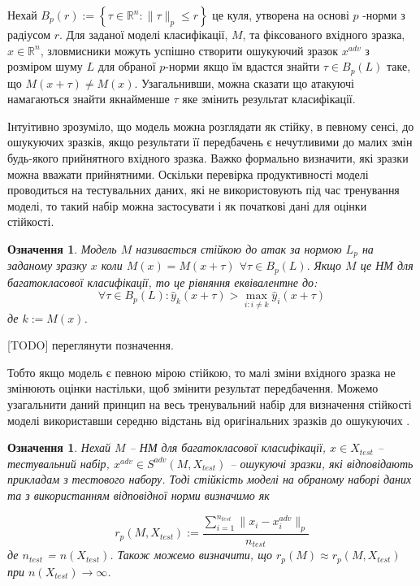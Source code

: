 \documentclass[14pt,a4paper]{extarticle}
\newcounter{e}
\newtheorem{defn}[theorem]{Означення}
\numberwithin{equation}{section}
\numberwithin{figure}{section}
\begin{document}
 Нехай $B_{p}(r):=\left\{\tau \in \mathbb{R}^{n}:\|\tau\|_{p} \leq r\right\}$ це куля, утворена на основі $p$ -норми з радіусом $r$. Для заданої моделі класифікації, $M$, та фіксованого вхідного зразка, $x \in \mathbb{R}^{n}$, зловмисники можуть успішно створити ошукуючий зразок $x^{adv}$ з розміром шуму $L$ для обраної $p$-норми якщо їм вдастся знайти $\tau \in B_{p}(L)$ таке, що $M(x+\tau) \neq M(x)$. Узагальнивши, можна сказати що атакуючі намагаються знайти якнайменше $\tau$ яке змінить результат класифікації.
 
 Інтуітивно зрозуміло, що модель можна розглядати як стійку, в певному сенсі, до ошукуючих зразків, якщо результати її передбачень є нечутливими до малих змін будь-якого прийнятного вхідного зразка. Важко формально визначити, які зразки можна вважати прийнятними. Оскільки перевірка продуктивності моделі проводиться на тестувальних даних, які не використовують під час тренування моделі, то такий набір можна застосувати і як початкові дані для оцінки стійкості.
 
 \begin{defn}
 Модель $M$ називається стійкою до атак за нормою $L_p$ на заданому зразку $x$ коли $M(x)=M(x+\tau)$ $\forall \tau \in B_{p}(L) .$ Якщо $M$ це НМ для багатокласової класифікації, то це рівняння еквівалентне до:
 \begin{equation}
 \forall \tau \in B_{p}(L): \hat{y}_{k}(x+\tau)>\max _{i: i \neq k} \hat{y}_{i}(x+\tau)
 \end{equation}
 де $k:=M(x)$.
 \end{defn}
 [TODO] переглянути позначення.
 
 Тобто якщо модель є певною мірою стійкою, то малі зміни вхідного зразка не змінюють оцінки настільки, щоб змінити результат передбачення. Можемо узагальнити даний принцип на весь тренувальний набір для визначення стійкості моделі використавши середню відстань від оригінальних зразків до ошукуючих .
 
 \begin{defn}
 Нехай $M$ -- НМ для багатокласової класифікації, $x \in X_{test}$ -- тестувальний набір, $x^{adv} \in S^{adv}(M, X_{test})$ -- ошукуючі зразки, які відповідають прикладам з тестового набору. Тоді стійкість моделі на обраному наборі даних та з використанням відповідної норми визначимо як
 
 \begin{equation}
 r_p(M, X_{test}) := \frac{\sum\limits^{n_{test}}_{i = 1}\|x_i-x^{adv}_i\|_{p}}{n_{test}}
 \end{equation}
 де $n_{test}$ = $n(X_{test})$. Також можемо визначити, що $r_p(M) \approx r_p(M, X_{test})$ при $ n(X_{test}) \to \infty$.
 
 \end{defn}
 
\end{document}
